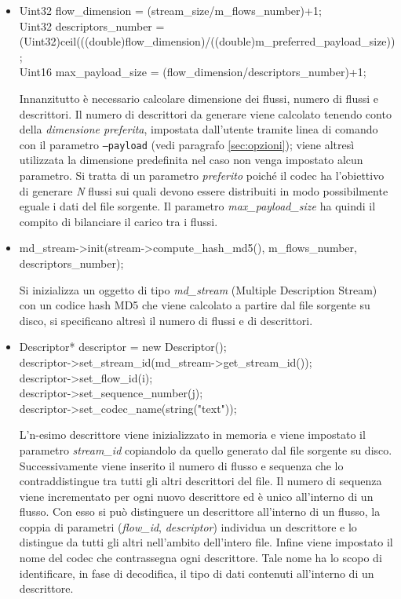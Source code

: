 \begin{itemize}
 \item \begin{code}
Uint32 flow\_dimension = (stream\_size/m\_flows\_number)+1;\\
Uint32 descriptors\_number = \\(Uint32)ceil(((double)flow\_dimension)/((double)m\_preferred\_payload\_size));\\
Uint16 max\_payload\_size = (flow\_dimension/descriptors\_number)+1;\\
\end{code}

Innanzitutto è necessario calcolare dimensione dei flussi, numero di flussi e
descrittori. Il numero di descrittori da generare viene calcolato tenendo conto
della \emph{dimensione preferita}, impostata dall'utente tramite linea di
comando con il parametro \texttt{--payload} (vedi paragrafo \ref{sec:opzioni});
viene altresì utilizzata la dimensione predefinita nel caso non venga impostato alcun parametro. Si tratta di un parametro \emph{preferito} poiché il codec ha l'obiettivo di generare \emph{N} flussi sui quali devono essere distribuiti in modo possibilmente eguale i dati del file sorgente. Il parametro \textit{max\_payload\_size} ha quindi il compito di bilanciare il carico tra i flussi.

 \item \begin{code}
md\_stream->init(stream->compute\_hash\_md5(), m\_flows\_number, descriptors\_number);\\
\end{code}
Si inizializza un oggetto di tipo \textit{md\_stream} (Multiple Description
Stream) con un codice hash MD5 che viene calcolato a partire dal file sorgente su disco, si specificano altresì il numero di flussi e di descrittori.

 \item \begin{code}
Descriptor* descriptor = new Descriptor();\\
descriptor->set\_stream\_id(md\_stream->get\_stream\_id());\\
descriptor->set\_flow\_id(i);\\
descriptor->set\_sequence\_number(j);\\
descriptor->set\_codec\_name(string("text"));\\
\end{code}
L'n-esimo descrittore viene inizializzato in memoria e viene impostato il
parametro \textit{stream\_id} copiandolo da quello generato dal file sorgente su disco. Successivamente viene inserito il numero di flusso e sequenza che lo contraddistingue tra tutti gli altri descrittori del file. Il numero di sequenza viene incrementato per ogni nuovo descrittore ed è unico all'interno di un flusso. Con esso si può distinguere un descrittore all'interno di un flusso, la coppia di parametri (\textit{flow\_id}, \textit{descriptor}) individua un descrittore e lo distingue da tutti gli altri nell'ambito dell'intero file. Infine viene impostato il nome del codec che contrassegna ogni descrittore. Tale nome ha lo scopo di identificare, in fase di decodifica, il tipo di dati contenuti all'interno di un descrittore.


\end{itemize}
